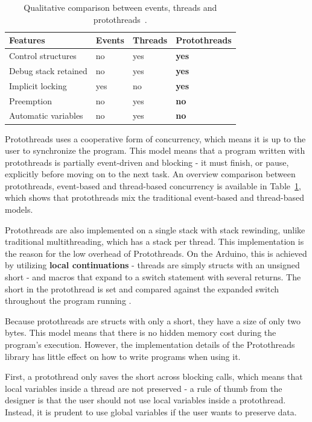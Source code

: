 \begin{table}[htb!]
  \centering
  \begin{tabular}{lll>{\bfseries}l}
    \toprule
    Features             & Events & Threads & Protothreads \\ \midrule
    Control structures   & no     & yes     & yes          \\
    Debug stack retained & no     & yes     & yes          \\
    Implicit locking     & yes    & no      & yes          \\
    Preemption           & no     & yes     & no           \\
    Automatic variables  & no     & yes     & no
  \end{tabular}
  \caption{Qualitative comparison between events, threads and protothreads~\cite{dunkels05using}.}
  \label{tab:protothreadscomparison}
\end{table}


Protothreads uses a cooperative form of concurrency, which means it is up to the user to synchronize the program. This model means that a program written with protothreads is partially event-driven and blocking - it must finish, or pause, explicitly before moving on to the next task. An overview comparison between protothreads, event-based and thread-based concurrency is available in Table~\ref{tab:protothreadscomparison}, which shows that protothreads mix the traditional event-based and thread-based models.

Protothreads are also implemented on a single stack with stack rewinding, unlike traditional multithreading, which has a stack per thread. This implementation is the reason for the low overhead of Protothreads. On the Arduino, this is achieved by utilizing \textbf{local continuations} - threads are simply structs with an unsigned short - and macros that expand to a switch statement with several returns. The short in the protothread is set and compared against the expanded switch throughout the program running \cite{AdamDunkelProtothreads}.




Because protothreads are structs with only a short, they have a size of only two bytes. This model means that there is no hidden memory cost during the program's execution. However, the implementation details of the Protothreads library has little effect on how to write programs when using it.

First, a protothread only saves the short across blocking calls, which means that local variables inside a thread are not preserved - a rule of thumb from the designer is that the user should not use local variables inside a protothread. Instead, it is prudent to use global variables if the user wants to preserve data.

